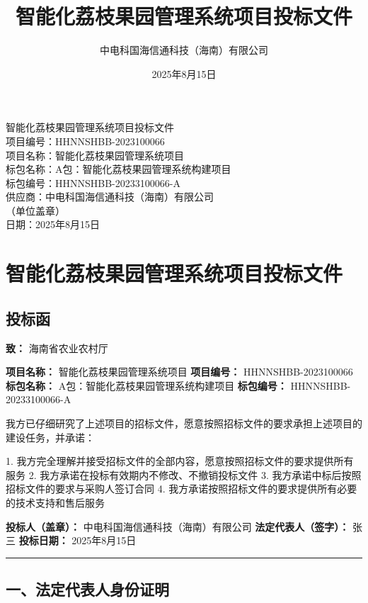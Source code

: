 \documentclass[12pt,a4paper]{article}
\title{\textbf{智能化荔枝果园管理系统项目投标文件}}
\author{中电科国海信通科技（海南）有限公司}
\date{2025年8月15日}
\begin{document}
\thispagestyle{empty}
\begin{center}
{\heiti 智能化荔枝果园管理系统项目投标文件}\\[24pt]
{\songti 项目编号：HHNNSHBB-2023100066}\\[8pt]
{\songti 项目名称：智能化荔枝果园管理系统项目}\\[8pt]
{\songti 标包名称：A包：智能化荔枝果园管理系统构建项目}\\[8pt]
{\songti 标包编号：HHNNSHBB-20233100066-A}\\[24pt]
{\heiti 供应商：中电科国海信通科技（海南）有限公司}\\[8pt]
{\songti （单位盖章）}\\[28pt]
{\songti 日期：2025年8月15日}
\end{center}
\clearpage

\thispagestyle{empty}
\tableofcontents
\clearpage

\setcounter{page}{1}

\section{智能化荔枝果园管理系统项目投标文件}


\subsection{投标函}


\textbf{致：} 海南省农业农村厅

\textbf{项目名称：} 智能化荔枝果园管理系统项目
\textbf{项目编号：} HHNNSHBB-2023100066
\textbf{标包名称：} A包：智能化荔枝果园管理系统构建项目
\textbf{标包编号：} HHNNSHBB-20233100066-A

我方已仔细研究了上述项目的招标文件，愿意按照招标文件的要求承担上述项目的建设任务，并承诺：

1. 我方完全理解并接受招标文件的全部内容，愿意按照招标文件的要求提供所有服务
2. 我方承诺在投标有效期内不修改、不撤销投标文件
3. 我方承诺中标后按照招标文件的要求与采购人签订合同
4. 我方承诺按照招标文件的要求提供所有必要的技术支持和售后服务

\textbf{投标人（盖章）：} 中电科国海信通科技（海南）有限公司
\textbf{法定代表人（签字）：} 张三
\textbf{投标日期：} 2025年8月15日

\hrule


\subsection{一、法定代表人身份证明}
\end{document}
